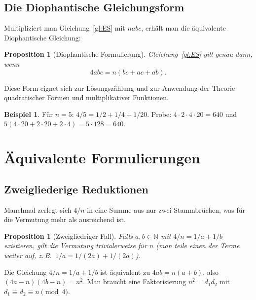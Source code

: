 \documentclass[12pt,a4paper]{amsart}
\newtheorem{proposition}[theorem]{Proposition}
\theoremstyle{definition}
\newtheorem{example}[theorem]{Beispiel}
\newcommand{\N}{\mathbb{N}}
\begin{document}
\subsection{Die Diophantische Gleichungsform}

Multipliziert man Gleichung~\eqref{gl:ES} mit $nabc$, erhält man die
äquivalente Diophantische Gleichung:

\begin{proposition}[Diophantische Formulierung]\label{prop:dioph}
Gleichung~\eqref{gl:ES} gilt genau dann, wenn
\begin{equation}\label{gl:dioph}
  4abc = n(bc + ac + ab).
\end{equation}
\end{proposition}

Diese Form eignet sich zur Lösungszählung und zur Anwendung der Theorie
quadratischer Formen und multiplikativer Funktionen.

\begin{example}
Für $n = 5$: $4/5 = 1/2 + 1/4 + 1/20$.  Probe:
$4 \cdot 2 \cdot 4 \cdot 20 = 640$ und $5(4 \cdot 20 + 2 \cdot 20 + 2 \cdot 4)
= 5 \cdot 128 = 640$. \checkmark
\end{example}

\section{Äquivalente Formulierungen}

\subsection{Zweigliederige Reduktionen}

Manchmal zerlegt sich $4/n$ in eine Summe aus nur zwei Stammbrüchen,
was für die Vermutung mehr als ausreichend ist.

\begin{proposition}[Zweigliedriger Fall]\label{prop:zweigliedrig}
Falls $a, b \in \N$ mit $4/n = 1/a + 1/b$ existieren, gilt die Vermutung
trivialerweise für $n$ (man teile einen der Terme weiter auf,
z.\,B.\ $1/a = 1/(2a) + 1/(2a)$).
\end{proposition}

Die Gleichung $4/n = 1/a + 1/b$ ist äquivalent zu
$4ab = n(a+b)$, also $(4a - n)(4b - n) = n^2$.
Man braucht eine Faktorisierung $n^2 = d_1 d_2$ mit
$d_1 \equiv d_2 \equiv n \pmod{4}$.
\end{document}
